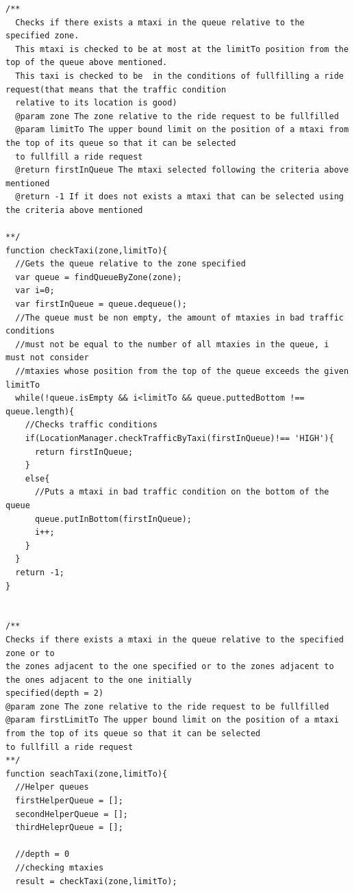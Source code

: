 \documentclass[11pt,titlepage]{article} %
\begin{document}
\begin{lstlisting}
/**
  Checks if there exists a mtaxi in the queue relative to the specified zone.
  This mtaxi is checked to be at most at the limitTo position from the top of the queue above mentioned.
  This taxi is checked to be  in the conditions of fullfilling a ride request(that means that the traffic condition
  relative to its location is good)
  @param zone The zone relative to the ride request to be fullfilled
  @param limitTo The upper bound limit on the position of a mtaxi from the top of its queue so that it can be selected
  to fullfill a ride request
  @return firstInQueue The mtaxi selected following the criteria above mentioned
  @return -1 If it does not exists a mtaxi that can be selected using the criteria above mentioned

**/
function checkTaxi(zone,limitTo){
  //Gets the queue relative to the zone specified
  var queue = findQueueByZone(zone);
  var i=0;
  var firstInQueue = queue.dequeue();
  //The queue must be non empty, the amount of mtaxies in bad traffic conditions
  //must not be equal to the number of all mtaxies in the queue, i must not consider
  //mtaxies whose position from the top of the queue exceeds the given limitTo
  while(!queue.isEmpty && i<limitTo && queue.puttedBottom !== queue.length){
    //Checks traffic conditions
    if(LocationManager.checkTrafficByTaxi(firstInQueue)!== 'HIGH'){
      return firstInQueue;
    }
    else{
      //Puts a mtaxi in bad traffic condition on the bottom of the queue
      queue.putInBottom(firstInQueue);
      i++;
    }
  }
  return -1;
}


/**
Checks if there exists a mtaxi in the queue relative to the specified zone or to
the zones adjacent to the one specified or to the zones adjacent to the ones adjacent to the one initially
specified(depth = 2)
@param zone The zone relative to the ride request to be fullfilled
@param firstLimitTo The upper bound limit on the position of a mtaxi from the top of its queue so that it can be selected
to fullfill a ride request
**/
function seachTaxi(zone,limitTo){
  //Helper queues
  firstHelperQueue = [];
  secondHelperQueue = [];
  thirdHeleprQueue = [];

  //depth = 0
  //checking mtaxies
  result = checkTaxi(zone,limitTo);


\end{lstlisting}
\end{document}
